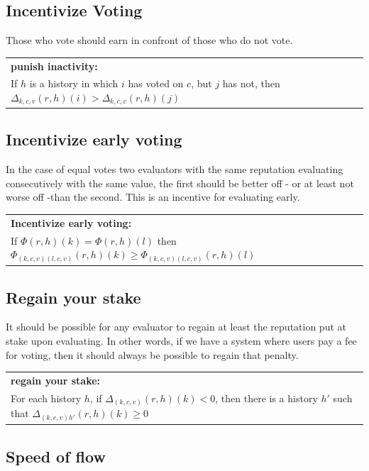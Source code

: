\documentclass{article}
\newcommand{\flow}{\Phi}
\newenvironment{condition}[1]
	{
	\begin{center}
	   \begin{tabular}{|p{.9\textwidth}|}
		\hline \medskip
		{\bf #1:}\\
	}
	{
		\medskip \\\hline
	\end{tabular}
	\end{center}
	}
\begin{document}



\subsection{Incentivize Voting}

Those who vote should earn in confront of those who do not vote.
\begin{condition}{punish inactivity}
If $h$ is a history in which $i$ has voted on $c$, but $j$ has not, then
$\Delta_{k, c, v}(r, h)(i) > \Delta_{k, c, v}(r, h)(j)$
\label{condition:punish_non_active}
\end{condition}

\subsection{Incentivize early voting}
In the case of equal votes two evaluators with the same reputation evaluating consecutively with the same value, the first should be better off - or at least not worse off -than the second. This is an incentive for evaluating early.
\begin{condition}{Incentivize early voting}
If $\flow(r, h)(k) = \flow(r, h)(l)$ then $\flow_{(k, c, v)(l,c,v)}(r, h)(k) \geq  \flow_{(k, c, v)(l, c, v)}(r, h)(l)$
\end{condition}

\subsection{Regain your stake}
It should be possible for any evaluator to regain at least the reputation put at stake upon evaluating. In other words, if we have a system where users pay a fee for voting, then it should always be possible to regain that penalty. 
\begin{condition}{regain your stake}
For each history $h$, if $\Delta_{(k, c, v)}(r, h)(k) < 0$, then there is a history $h'$ such that $\Delta_{(k,c,v)h'}(r, h)(k) \geq 0$ 
\end{condition}


\subsection{Speed of flow}
\end{document}
